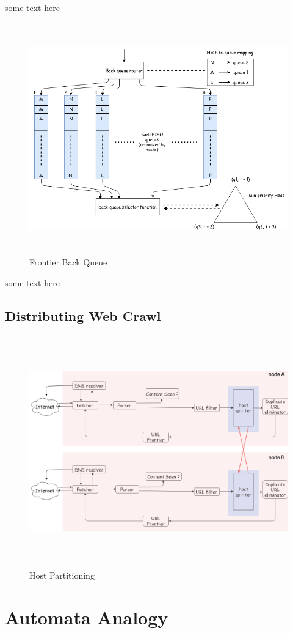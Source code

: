 \pagebreak
some text here
\begin{figure}[h!]
  \centering
  \includegraphics[width=13cm,height=10cm,keepaspectratio]{../media/crawler/b-queue.png}
  \caption{Frontier Back Queue}
  \label{fig:bqueue}
\end{figure}

\pagebreak
some text here
\subsection{Distributing Web Crawl}
\begin{figure}[h!]
  \centering
  \includegraphics[width=15cm,height=10cm,keepaspectratio]{../media/crawler/host-splitterv3.png}
  \caption{Host Partitioning}
  \label{fig:hpart}
\end{figure}

\pagebreak

\section{Automata Analogy}